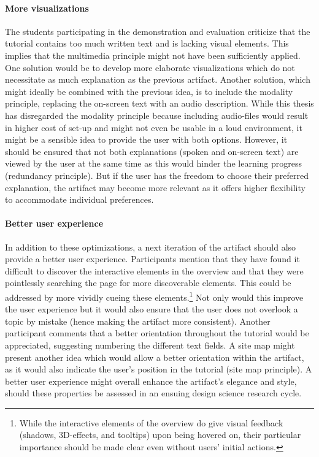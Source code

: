 \paragraph{More visualizations} The students participating in the demonstration and evaluation criticize that the tutorial contains too much written text and is lacking visual elements. This implies that the multimedia principle might not have been sufficiently applied. One solution would be to develop more elaborate visualizations which do not necessitate as much explanation as the previous artifact. Another solution, which might ideally be combined with the previous idea, is to include the modality principle, replacing the on-screen text with an audio description. While this thesis has disregarded the modality principle because including audio-files would result in higher cost of set-up and might not even be usable in a loud environment, it might be a sensible idea to provide the user with both options. However, it should be ensured that not both explanations (spoken and on-screen text) are viewed by the user at the same time as this would hinder the learning progress (redundancy principle). But if the user has the freedom to choose their preferred explanation, the artifact may become more relevant as it offers higher flexibility to accommodate individual preferences.

\paragraph{Better user experience} In addition to these optimizations, a next iteration of the artifact should also provide a better user experience. Participants mention that they have found it difficult to discover the interactive elements in the overview and that they were pointlessly searching the page for more discoverable elements. This could be addressed by more vividly cueing these elements.\footnote{While the interactive elements of the overview do give visual feedback (shadows, 3D-effects, and tooltips) upon being hovered on, their particular importance should be made clear even without users' initial actions.} Not only would this improve the user experience but it would also ensure that the user does not overlook a topic by mistake (hence making the artifact more consistent). Another participant comments that a better orientation throughout the tutorial would be appreciated, suggesting numbering the different text fields. A site map might present another idea which would allow a better orientation within the artifact, as it would also indicate the user's position in the tutorial (site map principle). A better user experience might overall enhance the artifact's elegance and style, should these properties be assessed in an ensuing design science research cycle. 

